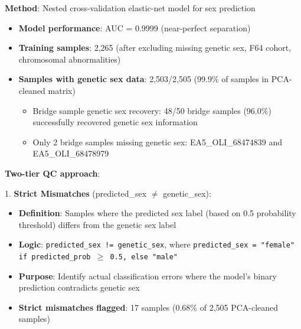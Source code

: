 \documentclass[11pt,a4paper]{article}
\begin{document}
\textbf{Method}: Nested cross-validation elastic-net model for sex prediction
\begin{itemize}
\item \textbf{Model performance}: AUC = 0.9999 (near-perfect separation)
\item \textbf{Training samples}: 2,265 (after excluding missing genetic sex, F64 cohort, chromosomal abnormalities)
\item \textbf{Samples with genetic sex data}: 2,503/2,505 (99.9\% of samples in PCA-cleaned matrix)
  \begin{itemize}
    \item Bridge sample genetic sex recovery: 48/50 bridge samples (96.0\%) successfully recovered genetic sex information
    \item Only 2 bridge samples missing genetic sex: EA5\_OLI\_68474839 and EA5\_OLI\_68478979
  \end{itemize}
\end{itemize}

\textbf{Two-tier QC approach}:

1. \textbf{Strict Mismatches} (predicted\_sex $\neq$ genetic\_sex):
   \begin{itemize}
     \item \textbf{Definition}: Samples where the predicted sex label (based on 0.5 probability threshold) differs from the genetic sex label
     \item \textbf{Logic}: \texttt{predicted\_sex != genetic\_sex}, where \texttt{predicted\_sex = "female" if predicted\_prob $\geq$ 0.5, else "male"}
     \item \textbf{Purpose}: Identify actual classification errors where the model's binary prediction contradicts genetic sex
     \item \textbf{Strict mismatches flagged}: 17 samples (0.68\% of 2,505 PCA-cleaned samples)
   \end{itemize}
\end{document}
